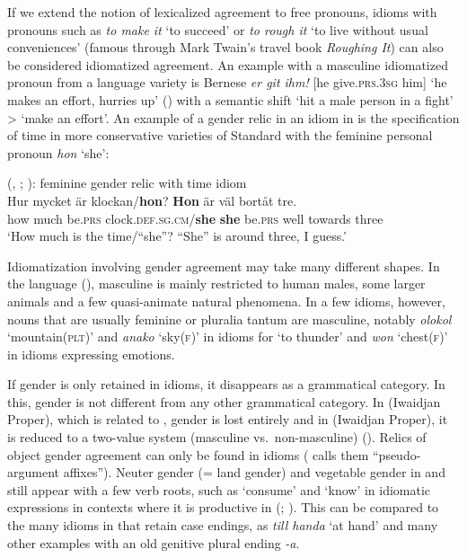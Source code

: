 \documentclass[output=collectionpaper]{langsci/langscibook}
\begin{document}
If we extend the notion of lexicalized agreement to free pronouns, idioms with pronouns such as  \textit{to make it} `to succeed' or \textit{to rough it} `to live without usual conveniences' (famous through Mark Twain's travel book \textit{Roughing It}) can also be considered idiomatized agreement. An example with a masculine idiomatized pronoun from a  language variety is Bernese  \textit{er git ihm!} [he give.\textsc{prs.3sg} him] `he makes an effort, hurries up' (\citealt[125]{Greyerz1997}) with a semantic shift `hit a male person in a fight' > `make an effort'. An example of a gender relic in an idiom in  is the specification of time in more conservative varieties of Standard  with the feminine personal pronoun \textit{hon} `she':

\ea\label{ex:WDG:74}
 (, ; \citealt[276]{Teleman1999}): feminine gender relic with time idiom\\
\gll Hur	mycket	är	klockan/\textbf{hon}?	\textendash{}	\textbf{Hon}	är	väl	bortåt	tre.\\
how	much	be.\textsc{prs}	clock.\textsc{def.sg.cm}/\textbf{she}	{} \textbf{she}	be.\textsc{prs}	well	towards	three\\
\glt `How much is the time/``she''? \textendash ``She'' is around three, I guess.'\\
\z

Idiomatization involving gender agreement may take many different shapes. In the  language  (), masculine is mainly restricted to human males, some larger animals and a few quasi-animate natural phenomena. In a few idioms, however, nouns that are usually feminine or pluralia tantum are masculine, notably \textit{olokol} `mountain(\textsc{plt})' and \textit{anako} `sky(\textsc{f})' in idioms for `to thunder' and \textit{won} `chest(\textsc{f})' in idioms expressing emotions.

If gender is only retained in idioms, it disappears as a grammatical category. In this, gender is not different from any other grammatical category. In  (Iwaidjan Proper), which is related to , gender is lost entirely and in  (Iwaidjan Proper), it is reduced to a two-value system (masculine vs.\ non-masculine) (\citealt[115]{Evans2000}). Relics of object gender agreement can only be found in idioms (\citealt{Evans2000} calls them ``pseudo-argument affixes''). Neuter gender (= land gender) and vegetable gender in  and  still appear with a few verb roots, such as `consume' and `know' in idiomatic expressions in contexts where it is productive in  (\citealt[116]{Evans2000}; \citealt[643]{Singer2011}). This can be compared to the many idioms in  that retain case endings, as \textit{till handa} `at hand' and many other examples with an old genitive plural ending \textit{-a}.
\end{document}
